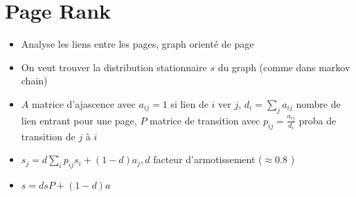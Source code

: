 \documentclass{article}
\theoremstyle{plain}%
\theoremstyle{definition}
\theoremstyle{remark}
\begin{document}
\section{Page Rank}
\begin{itemize}
    \item Analyse les liens entre les pages, graph orienté de page
    \item On veut trouver la distribution stationnaire $ s $ du graph (comme dans markov chain)
    \item $ A $ matrice d'ajascence avec $ a_{ij} = 1$ si lien de $ i $ ver $ j $, $ d_i = \sum_{j}^{} a_{ij} $ nombre de lien entrant pour une page, $ P $ matrice de transition avec $ p_{ij} = \frac{a_{ij}}{d_i}$ proba de transition de $ j $ à $ i $ 
    \item $ s_j = d \sum_{i}^{}p_{ij} s_i + (1 - d) a_j, d$ facteur d'armotissement ($ \approx 0.8 $ )
    \item $ s = dsP + (1-d)a $ 
\end{itemize}
\end{document}
